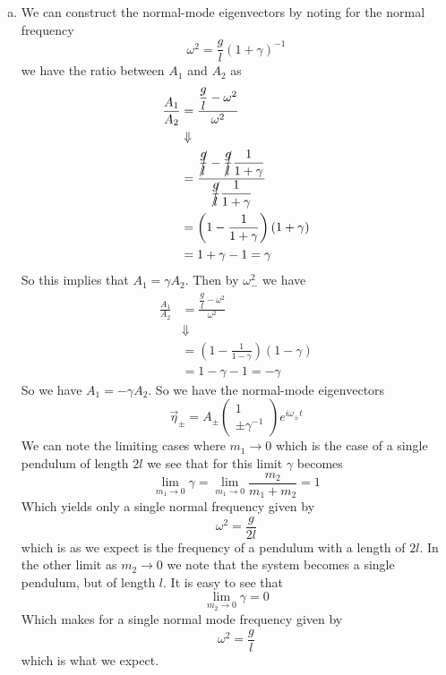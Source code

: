 \documentclass[11pt]{article}
\numberwithin{equation}{section}
\begin{document}
\begin{enumerate}[(a)]
\item We can construct the normal-mode eigenvectors by noting for the normal frequency
$$\omega^2 = \dfrac{g}{l}(1+\gamma)^{-1}$$
we have the ratio between $A_1$ and $A_2$ as
\begin{align*}
\frac{A_1}{A_2} &= \frac{\dfrac{g}{l}-\omega^2}{\omega^2}\\
&\Downarrow\\
&= \frac{\cancel{\dfrac{g}{l}}-\cancel{\dfrac{g}{l}}\dfrac{1}{1+\gamma}}{\cancel{\dfrac{g}{l}}\dfrac{1}{1+\gamma}}\\
&= \left(1-\frac{1}{1+\gamma}\right)(1+\gamma)\\
&= 1+\gamma - 1 = \gamma
\end{align*}
So this implies that $A_1 = \gamma{A_2}$. Then by $\omega^2_{-}$ we have
\begin{align*}
\frac{A_1}{A_2} &= \frac{\dfrac{g}{l}-\omega^2}{\omega^2}\\
&\Downarrow\\
&= \left(1-\frac{1}{1-\gamma}\right)(1-\gamma)\\
&= 1-\gamma - 1 = -\gamma
\end{align*}
So we have $A_1 = -\gamma{A_2}$. So we have the normal-mode eigenvectors 
$$\vec{\eta}_{\pm} = A_{\pm}\left(\begin{array}{c} 1\\ \pm\gamma^{-1}\end{array}\right)e^{i\omega_{\pm}t}$$
We can note the limiting cases where $m_1\rightarrow{0}$ which is the case of a single 
pendulum of length $2l$ we see that for this limit $\gamma$ becomes
$$\lim_{m_1\rightarrow{0}}\gamma = \lim_{m_1\rightarrow{0}}\frac{m_2}{m_1+m_2} = 1$$
Which yields only a single normal frequency given by
$$\omega^2=\frac{g}{2l}$$
which is as we expect is the frequency of a pendulum with a length of $2l$. In the other 
limit as $m_2\rightarrow{0}$ we note that the system becomes a single pendulum, but of 
length $l$. It is easy to see that 
$$\lim_{m_2\rightarrow{0}}\gamma=0$$
Which makes for a single normal mode frequency given by
$$\omega^2=\frac{g}{l}$$
which is what we expect.


\end{enumerate}
\end{document}
